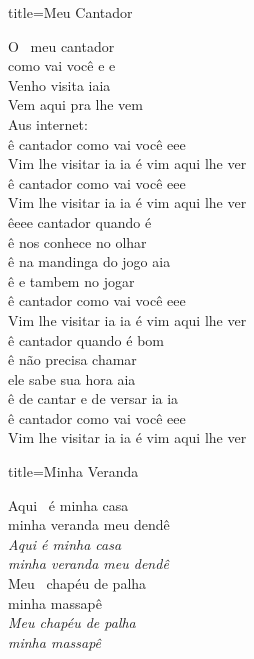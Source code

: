 \documentclass[fontsize=14pt, paper=a4, twoside, DIV=20]{scrreprt} %
\begin{document}
\begin{multicols*}{2}
\begin{song}{title={Meu Cantador}}
        \begin{verse*}
            O \ meu cantador\\
            como vai você e e\\
            Venho visita iaia\\
            Vem aqui pra lhe vem\\
            Aus internet:\\
            ê cantador como vai você eee\\
            Vim lhe visitar ia ia é vim aqui lhe ver\\
            ê cantador como vai você eee\\
            Vim lhe visitar ia ia é vim aqui lhe ver\\
            êeee cantador quando é\\
            ê nos conhece no olhar\\
            ê na mandinga do jogo aia\\
            ê e tambem no jogar\\
            ê cantador como vai você eee\\
            Vim lhe visitar ia ia é vim aqui lhe ver\\
            ê cantador quando é bom\\
            ê não precisa chamar\\
            ele sabe sua hora aia\\
            ê de cantar e de versar ia ia\\
            ê cantador como vai você eee\\
            Vim lhe visitar ia ia é vim aqui lhe ver\\
        \end{verse*}
\end{song}

\begin{song}{title={Minha Veranda}}
        \begin{verse*}
            Aqui \ é minha casa\\
            minha veranda meu dendê\\
            \textit{Aqui é minha casa}\\
            \textit{minha veranda meu dendê}\\

            Meu \ chapéu de palha\\
            minha massapê\\
            \textit{Meu chapéu de palha}\\
            \textit{minha massapê}\\


\end{verse*}
\end{song}
\end{multicols*}
\end{document}

